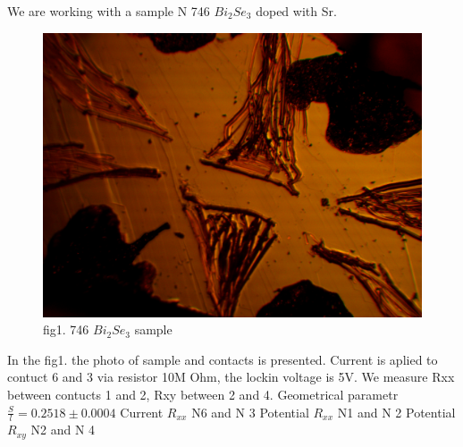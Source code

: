 \documentclass[idxtotoc,hyperref,openany,oneside]{labbook} %
\begin{document}
We are working with a sample N 746 $Bi_2Se_3$ doped with Sr. 
\begin{figure}[H] %
\begin{center}
\includegraphics[width=0.5\linewidth]{746.jpg}
\end{center}
\caption{fig1. 746 $Bi_2Se_3$ sample  }
\label{fig:fig1}
\end{figure}
In the fig1. the photo of sample and contacts is presented. Current is aplied to contuct  6 and 3 via resistor 10M Ohm, the lockin voltage is 5V. We measure Rxx between contucts  1 and 2, Rxy  between  2 and 4. 
\newline
Geometrical parametr $\frac{S}{l}=0.2518\pm0.0004$
\newline
Current $R_{xx}$ N6 and N 3
\newline
Potential $R_{xx}$ N1 and N 2
\newline
Potential $R_{xy}$ N2 and N 4
\newline
\end{document}
